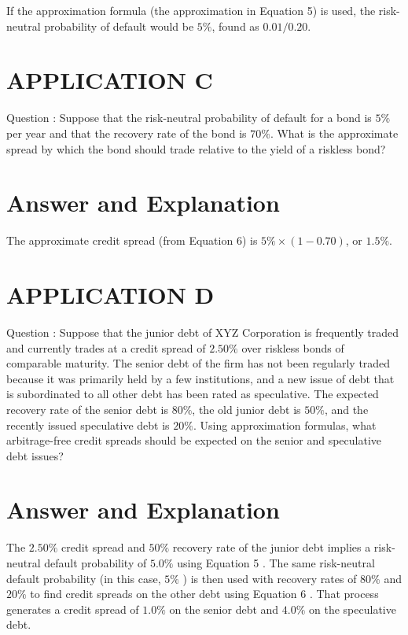 \documentclass[11pt]{article}
\begin{document}
If the approximation formula (the approximation in Equation 5) is used, the risk-neutral probability of default would be $5 \%$, found as $0.01 / 0.20$.

\section*{APPLICATION C}
Question : Suppose that the risk-neutral probability of default for a bond is $5 \%$ per year and that the recovery rate of the bond is $70 \%$. What is the approximate spread by which the bond should trade relative to the yield of a riskless bond?

\section*{Answer and Explanation}
The approximate credit spread (from Equation 6) is $5 \% \times(1-0.70)$, or $1.5 \%$.

\section*{APPLICATION D}
Question : Suppose that the junior debt of XYZ Corporation is frequently traded and currently trades at a credit spread of $2.50 \%$ over riskless bonds of comparable maturity. The senior debt of the firm has not been regularly traded because it was primarily held by a few institutions, and a new issue of debt that is subordinated to all other debt has been rated as speculative. The expected recovery rate of the senior debt is $80 \%$, the old junior debt is $50 \%$, and the recently issued speculative debt is $20 \%$. Using approximation formulas, what arbitrage-free credit spreads should be expected on the senior and speculative debt issues?

\section*{Answer and Explanation}
The $2.50 \%$ credit spread and $50 \%$ recovery rate of the junior debt implies a risk-neutral default probability of $5.0 \%$ using Equation 5 . The same risk-neutral default probability (in this case, $5 \%$ ) is then used with recovery rates of $80 \%$ and $20 \%$ to find credit spreads on the other debt using Equation 6 . That process generates a credit spread of $1.0 \%$ on the senior debt and $4.0 \%$ on the speculative debt.
\end{document}

